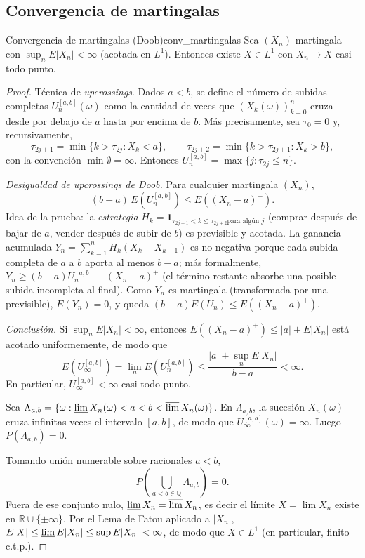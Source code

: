 \documentclass[11pt, a4paper]{article}
\begin{document}
\subsection{Convergencia de martingalas}

\begin{teorema}{Convergencia de martingalas (Doob)}{conv_martingalas}
Sea $(X_n)$ martingala con $\sup_n E|X_n| < \infty$ (acotada en $L^1$). Entonces existe
$X \in L^1$ con $X_n \to X$ casi todo punto.
\end{teorema}

\begin{proof}
Técnica de \emph{upcrossings}. Dados $a < b$, se define el número de subidas completas
$U_n^{[a,b]}(\omega)$ como la cantidad de veces que $(X_k(\omega))_{k=0}^n$ cruza desde por debajo
de $a$ hasta por encima de $b$. Más precisamente, sea $\tau_0 = 0$ y, recursivamente,
$$ \tau_{2j+1} = \min\{k > \tau_{2j} : X_k < a\}, \qquad \tau_{2j+2} = \min\{k > \tau_{2j+1} : X_k
> b\}, $$
con la convención $\min \emptyset = \infty$. Entonces $U_n^{[a,b]} = \max\{j : \tau_{2j} \le n\}$.

\textit{Desigualdad de upcrossings de Doob.} Para cualquier martingala $(X_n)$,
$$ (b - a) \, E(U_n^{[a,b]}) \le E((X_n - a)^+). $$
Idea de la prueba: la \emph{estrategia} $H_k = \mathbf{1}_{\tau_{2j+1} < k \le \tau_{2j+2} \text{
para algún } j}$ (comprar después de bajar de $a$, vender después de subir de $b$) es
previsible y acotada. La ganancia acumulada $Y_n = \sum_{k=1}^n H_k(X_k - X_{k-1})$ es
no-negativa porque cada subida completa de $a$ a $b$ aporta al menos $b - a$; más
formalmente, $Y_n \ge (b - a) U_n^{[a,b]} - (X_n - a)^+$ (el término restante absorbe una
posible subida incompleta al final). Como $Y_n$ es martingala (transformada por una previsible),
$E(Y_n) = 0$, y queda $(b - a) E(U_n) \le E((X_n - a)^+)$.

\textit{Conclusión.} Si $\sup_n E|X_n| < \infty$, entonces $E((X_n - a)^+) \le |a| + E|X_n|$
está
acotado uniformemente, de modo que
$$ E(U_\infty^{[a,b]}) = \lim_n E(U_n^{[a,b]}) \le \frac{|a| + \sup_n E|X_n|}{b - a} < \infty. $$
En particular, $U_\infty^{[a,b]} < \infty$ casi todo punto.

Sea $\Lambda_{a,b} = \{\omega : \varliminf X_n(\omega) < a < b < \varlimsup X_n(\omega)\}$.
En $\Lambda_{a,b}$, la sucesión $X_n(\omega)$ cruza infinitas veces el intervalo $[a, b]$, de modo
que $U_\infty^{[a,b]}(\omega) = \infty$. Luego $P(\Lambda_{a,b}) = 0$.

Tomando unión numerable sobre racionales $a < b$,
$$ P\!\left(\bigcup_{a < b \in \mathbb{Q}} \Lambda_{a,b}\right) = 0. $$
Fuera de ese conjunto nulo, $\varliminf X_n = \varlimsup X_n$, es decir el límite
$X = \lim X_n$ existe en $\mathbb{R} \cup \{\pm\infty\}$. Por el Lema de Fatou aplicado a $|X_n|$,
$E|X| \le \varliminf E|X_n| \le \sup E|X_n| < \infty$, de modo que $X \in L^1$ (en particular,
finito c.t.p.).
\end{proof}
\end{document}
